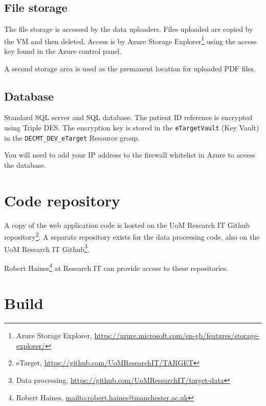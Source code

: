\documentclass[10pt,a4paper,oneside]{article}
\begin{document}
	\subsection{File storage}
	
	The file storage is accessed by the data uploaders. Files uploaded are copied by the VM and then deleted. 
	Access is by Azure Storage Explorer\footnote{Azure Storage Explorer, \url{https://azure.microsoft.com/en-gb/features/storage-explorer/}} 
	using the access key found in the Azure control panel.
	
	A second storage area is used as the premanent location for uploaded PDF files.
	
	\subsection{Database}
	
	Standard SQL server and SQL database. The patient ID reference is encrypted using Triple DES. 
	The encryption key is stored in the \verb|eTargetVault| (Key Vault) in the \verb|DECMT_DEV_eTarget| Resource group.
	
	You will need to add your IP address to the firewall whitelist in Azure to access the database.



\section{Code repository}
	A copy of the web application code is hosted on the UoM Research IT Github repository\footnote{eTarget, \url{https://github.com/UoMResearchIT/TARGET}}. A separate repository exists for the data processing code, also on the UoM Research IT Github\footnote{Data processing, \url{https://github.com/UoMResearchIT/target-data}}.
	
	Robert Haines\footnote{Robert Haines, \url{mailto:robert.haines@manchester.ac.uk}} at Research IT can provide access to these repositories.
	
\section{Build}
\label{sec:build}

\end{document}
